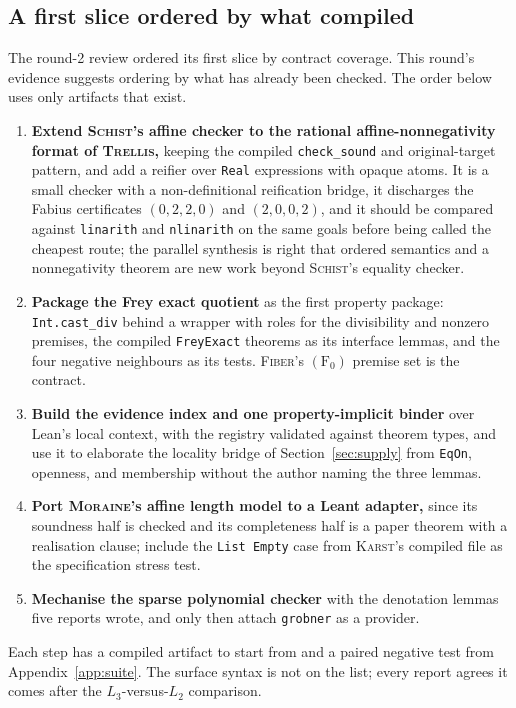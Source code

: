 \documentclass[11pt,a4paper]{article}
\newcommand{\code}[1]{\nolinkurl{#1}}
\newcommand{\Fb}{\textsc{Fiber}}
\newcommand{\Ks}{\textsc{Karst}}
\newcommand{\Mr}{\textsc{Moraine}}
\newcommand{\Sc}{\textsc{Schist}}
\newcommand{\Tr}{\textsc{Trellis}}
\theoremstyle{definition}
\begin{document}
\subsection{A first slice ordered by what compiled}\label{sec:slice}
The round-2 review ordered its first slice by contract coverage. This round's evidence suggests ordering by what has already been checked. The order below uses only artifacts that exist.
\begin{enumerate}
\item \textbf{Extend \Sc's affine checker to the rational affine-nonnegativity format of \Tr,} keeping the compiled \code{check_sound} and original-target pattern, and add a reifier over \code{Real} expressions with opaque atoms. It is a small checker with a non-definitional reification bridge, it discharges the Fabius certificates $(0,2,2,0)$ and $(2,0,0,2)$, and it should be compared against \code{linarith} and \code{nlinarith} on the same goals before being called the cheapest route; the parallel synthesis is right that ordered semantics and a nonnegativity theorem are new work beyond \Sc's equality checker.
\item \textbf{Package the Frey exact quotient} as the first property package: \code{Int.cast_div} behind a wrapper with roles for the divisibility and nonzero premises, the compiled \code{FreyExact} theorems as its interface lemmas, and the four negative neighbours as its tests. \Fb's $(\mathrm{F}_0)$ premise set is the contract.
\item \textbf{Build the evidence index and one property-implicit binder} over Lean's local context, with the registry validated against theorem types, and use it to elaborate the locality bridge of Section~\ref{sec:supply} from \code{EqOn}, openness, and membership without the author naming the three lemmas.
\item \textbf{Port \Mr's affine length model to a Leant adapter,} since its soundness half is checked and its completeness half is a paper theorem with a realisation clause; include the \code{List Empty} case from \Ks's compiled file as the specification stress test.
\item \textbf{Mechanise the sparse polynomial checker} with the denotation lemmas five reports wrote, and only then attach \code{grobner} as a provider.
\end{enumerate}
Each step has a compiled artifact to start from and a paired negative test from Appendix~\ref{app:suite}. The surface syntax is not on the list; every report agrees it comes after the $L_3$-versus-$L_2$ comparison.
\end{document}
